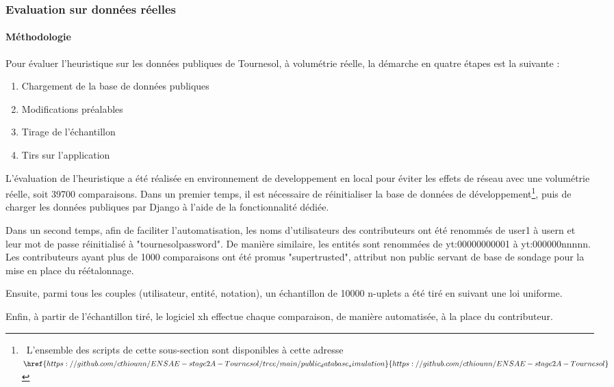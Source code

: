 \pagebreak

\subsubsection{Evaluation sur données réelles}


\paragraph{Méthodologie}

Pour évaluer l'heuristique sur les données publiques de Tournesol, à volumétrie réelle, la démarche en quatre étapes est la suivante :

\begin{enumerate}
    \item Chargement de la base de données publiques
    \item Modifications préalables
    \item Tirage de l'échantillon
    \item Tirs sur l'application
\end{enumerate}
L'évaluation de l'heuristique a été réalisée en environnement de developpement en local pour éviter les effets de réseau avec une volumétrie réelle, soit 39700 comparaisons.
Dans un premier temps, il est nécessaire de réinitialiser la base de données de développement\footnote{~L'ensemble des scripts de cette sous-section sont disponibles à cette adresse $\href{https://github.com/cthiounn/ENSAE-stage2A-Tournesol/tree/main/public_database_simulation}{https://github.com/cthiounn/ENSAE-stage2A-Tournesol}$}, puis de charger les données publiques par Django à l'aide de la fonctionnalité dédiée.

Dans un second temps, afin de faciliter l'automatisation, les noms d'utilisateurs des contributeurs ont été renommés de user1 à usern et leur mot de passe réinitialisé à "tournesolpassword". De manière similaire, les entités sont renommées de yt:00000000001 à yt:000000nnnnn. Les contributeurs ayant plus de 1000 comparaisons ont été promus "supertrusted", attribut non public servant de base de sondage pour la mise en place du réétalonnage.

Ensuite, parmi tous les couples (utilisateur, entité, notation), un échantillon de 10000 n-uplets a été tiré en suivant une loi uniforme.

Enfin, à partir de l'échantillon tiré, le logiciel xh effectue chaque comparaison, de manière automatisée, à la place du contributeur.


